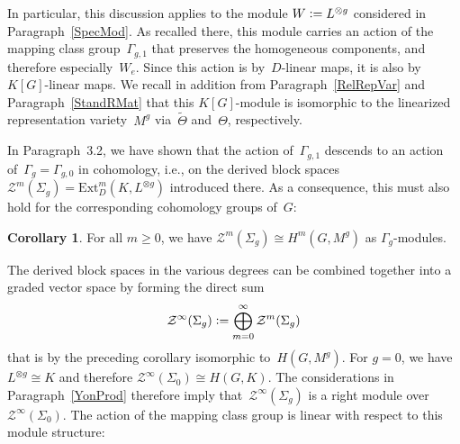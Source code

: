 \documentclass[12pt]{article}
\theoremstyle{definition}
\newtheorem{Cor}[Satz]{Corollary}
\theoremstyle{break}
\newcommand{\Ext}{\mathrm{Ext}}
\renewcommand{\1}{\mathbbm{1}}
\newcommand{\TFT}{\mathcal{Z}}
\newcommand{\ot}{\mathbin{\otimes}}
\newcommand{\deq}{\vcentcolon =}
\begin{document}
In particular, this discussion applies to the module $W \deq L^{\ot g}$ considered in Paragraph~\ref{SpecMod}. As recalled there, this module carries an action of the mapping class group~$\Gamma_{g,1}$ that preserves the homogeneous components, and therefore especially~$W_e$. Since this action is by~$D$-linear maps, it is also by $K[G]$-linear maps. We recall in addition from Paragraph~\ref{RelRepVar} and Paragraph~\ref{StandRMat} that this $K[G]$-module is isomorphic to the linearized representation variety~$M^g$ via~$\tilde{\Theta}$ and~$\Theta$, respectively.

In Paragraph~3.2, we have shown that the action of~$\Gamma_{g,1}$ descends to an action of~\mbox{$\Gamma_{g} = \Gamma_{g,0}$} in cohomology, i.e., on the derived block spaces
$\TFT^m(\Sigma_{g}) = \Ext_D^m(K, L^{\ot g})$ introduced there. As a consequence, this must also hold for the corresponding cohomology groups of~$G$:
\begin{Cor} \label{Group}
For all $m \ge 0$, we have $\TFT^m(\Sigma_{g}) \cong H^m(G, M^g)$ as $\Gamma_{g}$-modules.
\end{Cor}

The derived block spaces in the various degrees can be combined together into a graded vector space by forming the direct sum
\[\TFT^\infty(\Sigma_g) \deq \bigoplus_{m=0}^\infty \TFT^m(\Sigma_g) \]
that is by the preceding corollary isomorphic to~$H(G, M^g)$. For $g=0$, we have $L^{\ot g} \cong K$ and therefore $\TFT^\infty(\Sigma_0) \cong H(G, K)$. The considerations in Paragraph~\ref{YonProd} therefore imply that~$\TFT^\infty(\Sigma_g)$ is a right module over $\TFT^\infty(\Sigma_0)$. The action of the mapping class group is linear with respect to this module structure:
\end{document}

